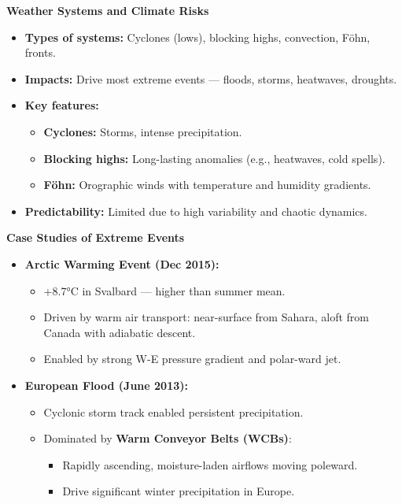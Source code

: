 \documentclass[fontsize=8pt, a4paper, landscape, fleqn]{scrartcl}
\renewcommand{\subsection}[1]{%
    \noindent\colorbox{subsectioncolor}{%
        \parbox{\dimexpr\columnwidth-2\fboxsep}{\color{white}\textbf{#1}}}%
    \vspace{0.5mm}%
}
\begin{document}
\begin{multicols*}{3}[\raggedcolumns]
\subsection{Weather Systems and Climate Risks}
\begin{itemize}
    \item \textbf{Types of systems:} Cyclones (lows), blocking highs, convection, Föhn, fronts.
    \item \textbf{Impacts:} Drive most extreme events — floods, storms, heatwaves, droughts.
    \item \textbf{Key features:}
    \begin{itemize}
        \item \textbf{Cyclones:} Storms, intense precipitation.
        \item \textbf{Blocking highs:} Long-lasting anomalies (e.g., heatwaves, cold spells).
        \item \textbf{Föhn:} Orographic winds with temperature and humidity gradients.
    \end{itemize}
    \item \textbf{Predictability:} Limited due to high variability and chaotic dynamics.
\end{itemize}

\subsection{Case Studies of Extreme Events}
\begin{itemize}
    \item \textbf{Arctic Warming Event (Dec 2015):}
    \begin{itemize}
        \item +8.7°C in Svalbard — higher than summer mean.
        \item Driven by warm air transport: near-surface from Sahara, aloft from Canada with adiabatic descent.
        \item Enabled by strong W-E pressure gradient and polar-ward jet.
    \end{itemize}

    \item \textbf{European Flood (June 2013):}
    \begin{itemize}
        \item Cyclonic storm track enabled persistent precipitation.
        \item Dominated by \textbf{Warm Conveyor Belts (WCBs)}:
        \begin{itemize}
            \item Rapidly ascending, moisture-laden airflows moving poleward.
            \item Drive significant winter precipitation in Europe.
        \end{itemize}
    \end{itemize}


\end{itemize}
\end{multicols*}
\end{document}
